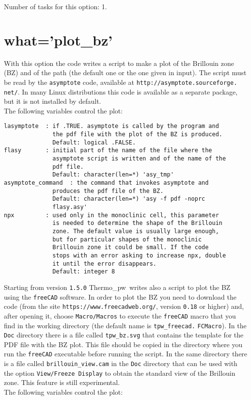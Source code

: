 \documentclass[12pt,a4paper,twoside]{report}
\def\thermo{{\sc Thermo\_pw}}
\begin{document}
Number of tasks for this option: 1.

\newpage
{\color{coral}\section{what='plot\_bz'}}
\color{black}
With this option the code writes a script to make a plot
of the Brillouin zone (BZ) and of the path (the default one or the 
one given in input). 
The script must be read by the \texttt{asymptote} code, available at 
\texttt{http://asymptote.sourceforge.} \texttt{net/}. In many Linux 
distributions
this code is available as a separate package, but it is not installed by
default. \\
The following variables control the plot:

\begin{verbatim}
lasymptote  : if .TRUE. asymptote is called by the program and 
              the pdf file with the plot of the BZ is produced.
              Default: logical .FALSE.
flasy       : initial part of the name of the file where the 
              asymptote script is written and of the name of the 
              pdf file.
              Default: character(len=*) 'asy_tmp'
asymptote_command  : the command that invokes asymptote and 
              produces the pdf file of the BZ.
              Default: character(len=*) 'asy -f pdf -noprc 
              flasy.asy'
npx         : used only in the monoclinic cell, this parameter 
              is needed to determine the shape of the Brillouin 
              zone. The default value is usually large enough, 
              but for particular shapes of the monoclinic 
              Brillouin zone it could be small. If the code 
              stops with an error asking to increase npx, double 
              it until the error disappears.
              Default: integer 8
\end{verbatim}


Starting from version \texttt{1.5.0} \thermo\ writes also a script to
plot the BZ using the \texttt{freeCAD} software. In order to plot
the BZ you need to download the code (from the site
\texttt{https://www.freecadweb.org/}, version \texttt{0.18} or higher)
and, after opening it, choose 
\texttt{Macro/Macros} to execute the \texttt{freeCAD} macro
that you find in the working directory (the default name is 
\texttt{tpw\_freecad.} \texttt{FCMacro}). 
In the \texttt{Doc} directory there is a file called \texttt{tpw\_bz.svg} 
that contains the template for the PDF file with the BZ plot. This file
should be copied in the directory where you run the \texttt{freeCAD} 
executable before running the script.
In the same directory there is a file called \texttt{brillouin\_view.cam} 
in the \texttt{Doc} directory that can be used with the option 
\texttt{View/Freeze Display} to obtain the standard view of the Brillouin zone.
This feature is still experimental.\\
The following variables control the plot:
\end{document}
